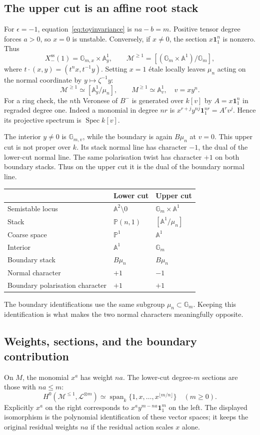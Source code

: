 \documentclass[11pt,a4paper]{article}
\numberwithin{equation}{section}
\theoremstyle{definition}
\newcommand{\A}{\mathbb A}
\newcommand{\PP}{\mathbb P}
\newcommand{\Gm}{\mathbb G_m}
\newcommand{\cL}{\mathcal L}
\newcommand{\cM}{\mathcal M}
\newcommand{\Spec}{\operatorname{Spec}}
\newcommand{\sst}{\mathrm{ss}}
\newcommand{\one}{\mathbf 1}
\begin{document}
\subsection{The upper cut is an affine root stack}
For $\epsilon=-1$, equation~\eqref{eq:toyinvariance} is $na-b=m$.
Positive tensor degree forces $a>0$, so $x=0$ is unstable. Conversely,
if $x\ne0$, the section $x\one_1^n$ is nonzero. Thus
\[
 X^{\sst}_-(1)=\mathbb G_{m,x}\times\A^1_y,
 \qquad
 \cM^{\ge1}=[(\Gm\times\A^1)/\Gm],
\]
where $t\cdot(x,y)=(t^n x,t^{-1}y)$. Setting $x=1$ étale locally
leaves $\mu_n$ acting on the normal coordinate by $y\mapsto\zeta^{-1}y$:
\[
 \cM^{\ge1}\simeq[\A^1_y/\mu_n],\qquad
 M^{\ge1}\simeq\A^1_v,\quad v=xy^n.
\]
For a ring check, the $n$th Veronese of $B^-$ is generated over $k[v]$
by $A=x\one_1^n$ in regraded degree one. Indeed a monomial in degree
$nr$ is $x^{r+j}y^{nj}\one_1^{nr}=A^r v^j$.
Hence its projective spectrum is $\Spec k[v]$.

The interior $y\ne0$ is $\mathbb G_{m,v}$, while the boundary is again $B\mu_n$
at $v=0$. This upper cut is not proper over $k$. Its stack normal line
has character $-1$, the dual of the lower-cut normal line. The same
polarisation twist has character $+1$ on both boundary stacks. Thus on
the upper cut it is the dual of the boundary normal line.

\begin{center}
\begin{tabular}{@{}lll@{}}
\toprule
 & Lower cut & Upper cut\\
\midrule
Semistable locus & $\A^2\setminus0$ & $\Gm\times\A^1$\\
Stack & $\PP(n,1)$ & $[\A^1/\mu_n]$\\
Coarse space & $\PP^1$ & $\A^1$\\
Interior & $\A^1$ & $\Gm$\\
Boundary stack & $B\mu_n$ & $B\mu_n$\\
Normal character & $+1$ & $-1$\\
Boundary polarisation character & $+1$ & $+1$\\
\bottomrule
\end{tabular}
\end{center}
The boundary identifications use the same subgroup $\mu_n\subset\Gm$.
Keeping this identification is what makes the two normal characters
meaningfully opposite.

\subsection{Weights, sections, and the boundary contribution}
On $M$, the monomial $x^a$ has weight $na$. The lower-cut degree-$m$
sections are those with $na\le m$:
\[
 H^0(\cM^{\le1},\cL^{\otimes m})
 \simeq\operatorname{span}_k\{1,x,\ldots,x^{\lfloor m/n\rfloor}\}
 \quad(m\ge0).
\]
Explicitly $x^a$ on the right corresponds to
$x^a y^{m-na}\one_1^m$ on the left. The displayed isomorphism is the
polynomial identification of these vector spaces; it keeps the original
residual weights $na$ if the residual action scales $x$ alone.
\end{document}
